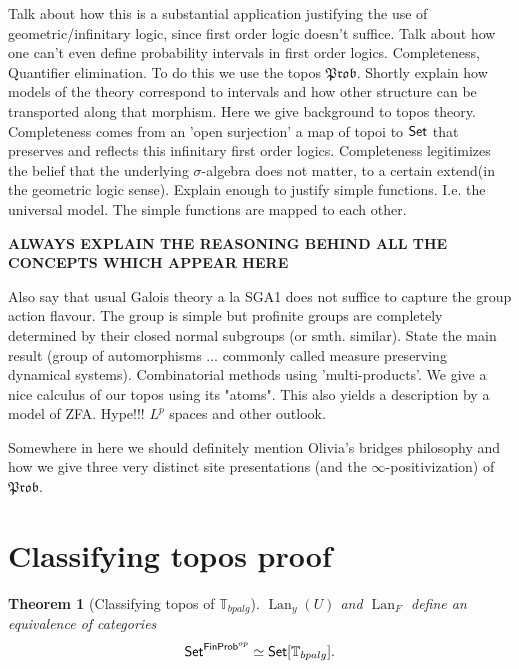 \documentclass[a4paper]{amsproc}
\theoremstyle{plain}
\newtheorem{theorem}{Theorem}[section]
\theoremstyle{definition}
\theoremstyle{remark}
\numberwithin{equation}{section}
\newcommand{\y}{\textit{y}}
\DeclareMathOperator{\Lan}{Lan}
\newcommand{\Set}{\textup{\textsf{Set}}}
\newcommand{\FinProb}{\textup{\textsf{FinProb}}}
\newcommand{\Prob}{\mathfrak{Prob}}
\begin{document}
\indent Talk about how this is a substantial application justifying the use of geometric/infinitary logic, since first order logic doesn't suffice. Talk about how one can't even define probability intervals in first order logics. Completeness, Quantifier elimination.\newline
\indent To do this we use the topos $\Prob$. Shortly explain how models of the theory correspond to intervals and how other structure can be transported along that morphism. Here we give background to topos theory. Completeness comes from an 'open surjection' a map of topoi to $\Set$ that preserves and reflects this infinitary first order logics. Completeness legitimizes the belief that the underlying $\sigma$-algebra does not matter, to a certain extend(in the geometric logic sense). Explain enough to justify simple functions. I.e. the universal model. The simple functions are mapped to each other.
\begin{center}\textbf{ALWAYS EXPLAIN THE REASONING BEHIND ALL THE CONCEPTS WHICH APPEAR HERE}\end{center}
Also say that usual Galois theory a la SGA1 does not suffice to capture the group action flavour. The group is simple but profinite groups are completely determined by their closed normal subgroups (or smth. similar). State the main result (group of automorphisms ... commonly called measure preserving dynamical systems).\newline
\indent Combinatorial methods using 'multi-products'. We give a nice calculus of our topos using its "atoms". This also yields a description by a model of ZFA. \newline
\indent Hype!!! $L^p$ spaces and other outlook.

Somewhere in here we should definitely mention Olivia's bridges philosophy and how we give three very distinct site presentations (and the $\infty$-positivization) of $\Prob$.

\section{Classifying topos proof}

\begin{theorem}[Classifying topos of $\mathbb{T}_{bpalg}$] \label{classifying_presheaf}
$\Lan_{\y}(U)$ and $\Lan_F$ define an equivalence of categories
\[
\Set^{\FinProb^{op}} \simeq \Set[\mathbb{T}_{bpalg}].
\]
\end{theorem}
\end{document}
